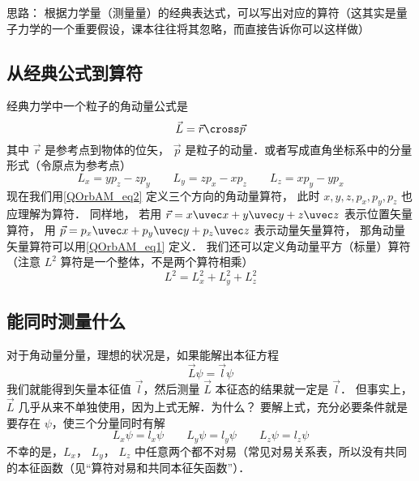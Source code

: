 

思路： 根据力学量（测量量）的经典表达式，可以写出对应的算符（这其实是量子力学的一个重要假设，课本往往将其忽略，而直接告诉你可以这样做）

\subsection{从经典公式到算符}

经典力学中一个粒子的角动量公式是
\begin{equation}\label{QOrbAM_eq1}
\vec L = \vec r \cross \vec p
\end{equation}
其中 $\vec r$ 是参考点到物体的位矢， $\vec p$ 是粒子的动量．或者写成直角坐标系中的分量形式（令原点为参考点）
\begin{equation}\label{QOrbAM_eq2}
L_x = y p_z - z p_y \qquad
L_y = z p_x - x p_z \qquad
L_z = x p_y - y p_x
\end{equation}   
现在我们用\autoref{QOrbAM_eq2} 定义三个方向的角动量算符， 此时 $x, y, z, p_x, p_y, p_z$ 也应理解为算符． 同样地， 若用 $\vec r = x\uvec x + y\uvec y + z\uvec z$ 表示位置矢量算符， 用 $\vec p = p_x \uvec x + p_y\uvec y + p_z\uvec z$ 表示动量矢量算符， 那角动量矢量算符可以用\autoref{QOrbAM_eq1} 定义． 我们还可以定义角动量平方（标量）算符（注意 $L^2$ 算符是一个整体，不是两个算符相乘）
\begin{equation}
L^2 = L_x^2 + L_y^2 + L_z^2
\end{equation}

\subsection{能同时测量什么}

对于角动量分量，理想的状况是，如果能解出本征方程
\begin{equation}
\vec L \psi  = \vec l\psi 
\end{equation}
我们就能得到矢量本征值 $\vec l$，然后测量 $\vec L$ 本征态的结果就一定是 $\vec l$． 但事实上， $\vec L$ 几乎从来不单独使用，因为上式无解．为什么？ 要解上式，充分必要条件就是要存在 $\psi$，使三个分量同时有解
\begin{equation}
L_x \psi  = l_x \psi \qquad
L_y \psi  = l_y \psi \qquad
L_z \psi  = l_z \psi 
\end{equation}   
不幸的是，$L_x$， $L_y$， $L_z$ 中任意两个都不对易（常见对易关系表，所以没有共同的本征函数（见“算符对易和共同本征矢函数”）．

